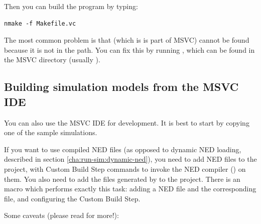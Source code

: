 Then you can build the program by typing:

\begin{verbatim}
nmake -f Makefile.vc
\end{verbatim}

The most common problem is that  (which is is part of MSVC)
cannot be found because it is not in the path. You can fix
this by running , which can be found in the
MSVC  directory (usually
).


\subsection{Building simulation models from the MSVC IDE}

You can also use the MSVC IDE for development.
It is best to start by copying one of the sample simulations.

If you want to use compiled NED files (as opposed to dynamic
NED loading, described in section \ref{cha:run-sim:dynamic-ned}),
you need to add NED files to the project, with Custom Build Step
commands to invoke the NED compiler () on them.
You also need to add the  files generated by 
to the project. There is an 
macro which performs exactly this task: adding a NED file and
the corresponding  file, and configuring
the Custom Build Step.


Some caveats (please read  for more!):

